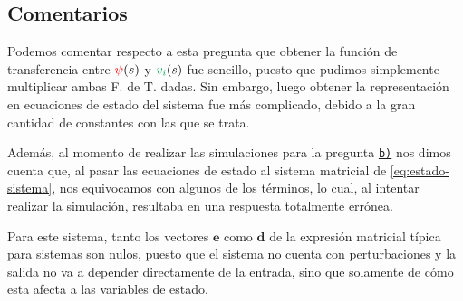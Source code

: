 \subsection{Comentarios}

Podemos comentar respecto a esta pregunta que obtener la función de transferencia
entre $\mathbin{\color{red}\psi}(s)$ y $\verd{v_{i}}(s)$ fue sencillo, puesto que pudimos
simplemente multiplicar ambas F. de T. dadas. Sin embargo, luego obtener la
representación en ecuaciones de estado del sistema fue más complicado, debido
a la gran cantidad de constantes con las que se trata.

Además, al momento de realizar las simulaciones para la pregunta \hyperref[pregunta-b]{\texttt{b)}}
nos dimos cuenta que, al pasar las ecuaciones de estado al sistema matricial de
\eqref{eq:estado-sistema}, nos equivocamos con algunos de los términos, lo cual,
al intentar realizar la simulación, resultaba en una respuesta totalmente errónea.

Para este sistema, tanto los vectores $\pmb{e}$ como $\pmb{d}$ de la expresión matricial
típica para sistemas son nulos, puesto que el sistema no cuenta con perturbaciones
y la salida no va a depender directamente de la entrada, sino que solamente de
cómo esta afecta a las variables de estado.
